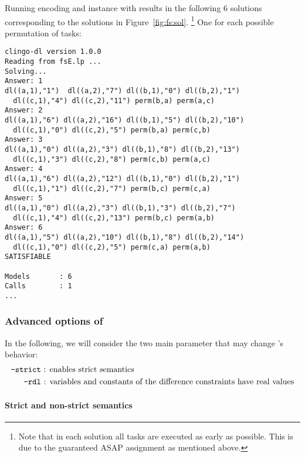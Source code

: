 \begin{example}
Running encoding and instance with  results in the following $6$ solutions
corresponding to the solutions in Figure~\ref{fig:fs:sol}.%
\footnote{Note that in each solution all tasks are executed as early as possible.
  This is due to the guaranteed ASAP assignment as mentioned above.}
One for each possible permutation of tasks:
 \begin{lstlisting}[numbers=none]
clingo-dl version 1.0.0
Reading from fsE.lp ...
Solving...
Answer: 1
dl((a,1),"1")  dl((a,2),"7") dl((b,1),"0") dl((b,2),"1") 
  dl((c,1),"4") dl((c,2),"11") perm(b,a) perm(a,c)
Answer: 2
dl((a,1),"6") dl((a,2),"16") dl((b,1),"5") dl((b,2),"10") 
  dl((c,1),"0") dl((c,2),"5") perm(b,a) perm(c,b)
Answer: 3
dl((a,1),"0") dl((a,2),"3") dl((b,1),"8") dl((b,2),"13") 
  dl((c,1),"3") dl((c,2),"8") perm(c,b) perm(a,c)
Answer: 4
dl((a,1),"6") dl((a,2),"12") dl((b,1),"0") dl((b,2),"1") 
  dl((c,1),"1") dl((c,2),"7") perm(b,c) perm(c,a)
Answer: 5
dl((a,1),"0") dl((a,2),"3") dl((b,1),"3") dl((b,2),"7") 
  dl((c,1),"4") dl((c,2),"13") perm(b,c) perm(a,b)
Answer: 6
dl((a,1),"5") dl((a,2),"10") dl((b,1),"8") dl((b,2),"14") 
  dl((c,1),"0") dl((c,2),"5") perm(c,a) perm(a,b)
SATISFIABLE

Models       : 6
Calls        : 1
...
\end{lstlisting}
\end{example}

\subsubsection{Advanced options of }

In the following, we will consider the two main parameter that may change 's behavior:
\begin{align*}
 \texttt{--strict}& \text{ : enables strict semantics}\\
 \texttt{--rdl}& \text{ : variables and constants of the difference constraints have real values} 
\end{align*}

\paragraph{Strict and non-strict semantics}


